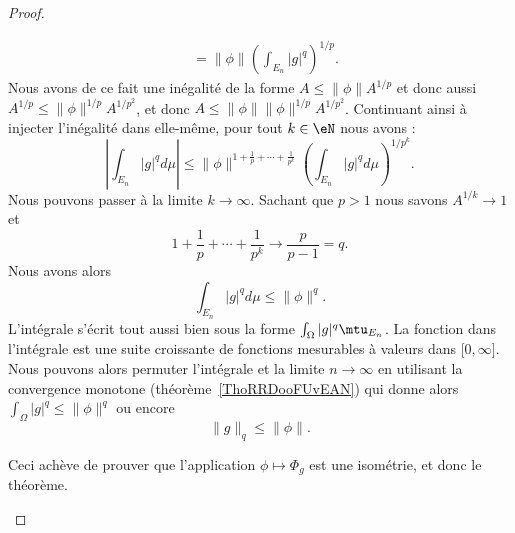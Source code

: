 \begin{proof}
\begin{subproof}
\begin{subequations}
\begin{align}
				                                   & =\| \phi \|\left( \int_{E_n}| g |^q \right)^{1/p}.
			\end{align}
		\end{subequations}
		Nous avons de ce fait une inégalité de la forme \( A\leq \| \phi \|A^{1/p}\) et donc aussi \( A^{1/p}\leq \| \phi \|^{1/p}A^{1/p^2}\), et donc \( A\leq \| \phi \|\| \phi \|^{1/p}A^{1/p^2}\). Continuant ainsi à injecter l'inégalité dans elle-même, pour tout \( k\in \eN\) nous avons :
		\begin{equation}
			\left| \int_{E_n}| g |^qd\mu \right| \leq\| \phi \|^{1+\frac{1}{ p }+\cdots+\frac{1}{ p^k }}\left( \int_{E_n}| g |^qd\mu \right)^{1/p^k}.
		\end{equation}
		Nous pouvons passer à la limite \( k\to \infty\). Sachant que \( p>1\) nous savons \( A^{1/k}\to 1\) et
		\begin{equation}
			1+\frac{1}{ p }+\cdots+\frac{1}{ p^k }\to\frac{ p }{ p-1 }=q.
		\end{equation}
		Nous avons alors
		\begin{equation}
			\int_{E_n}| g |^qd\mu\leq \| \phi \|^q.
		\end{equation}
		L'intégrale s'écrit tout aussi bien sous la forme \( \int_{\Omega}| g  |^q\mtu_{E_n}\). La fonction dans l'intégrale est une suite croissante de fonctions mesurables à valeurs dans \( \mathopen[ 0 , \infty \mathclose]\). Nous pouvons alors permuter l'intégrale et la limite \( n\to \infty\) en utilisant la convergence monotone (théorème~\ref{ThoRRDooFUvEAN}) qui donne alors \( \int_{\Omega}| g |^q\leq \| \phi \|^q\) ou encore
		\begin{equation}
			\| g \|_q\leq \| \phi \|.
		\end{equation}

		Ceci achève de prouver que l'application \( \phi\mapsto \Phi_g\) est une isométrie, et donc le théorème.
	\end{subproof}
\end{proof}

